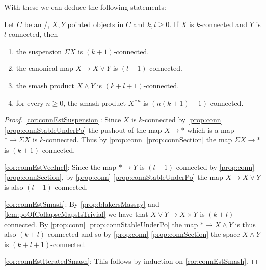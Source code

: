 With these we can deduce the following statements:
\begin{corollary}\label{cor:connEst}
    Let $C$ be an \inftytop/, $X,Y$ pointed objects in $C$ and $k,l\geq 0$. 
    If $X$ is $k$-connected and $Y$ is $l$-connected, then
    \begin{enumerate}[label={(\roman*)}]
        \item the suspension $\Sigma X$ is $(k+1)$-connected. \label{cor:connEstSuspension}
        \item the canonical map $X\to X\vee Y$ is $(l-1)$-connected. \label{cor:connEstVeeIncl}
        \item the smash product $X\wedge Y$ is $(k + l + 1)$-connected. \label{cor:connEstSmash}
        \item for every $n\geq 0$, the smash product $X^{\wedge n}$ is $(n(k+1)-1)$-connected. \label{cor:connEstIteratedSmash}
    \end{enumerate}
    \begin{proof}
        \ref{cor:connEstSuspension}: Since $X$ is $k$-connected by \cref{prop:conn} \ref{prop:connStableUnderPo} the pushout of the map $X\to *$ which is a map $*\to \Sigma X$ is $k$-connected.
        Thus by \cref{prop:conn} \ref{prop:connSection} the map $\Sigma X\to *$ is $(k+1)$-connected.

        \ref{cor:connEstVeeIncl}: Since the map $*\to Y$ is $(l-1)$-connected by \cref{prop:conn} \ref{prop:connSection}, by \cref{prop:conn} \ref{prop:connStableUnderPo} the map $X\to X\vee Y$ is also $(l-1)$-connected.
        
        \ref{cor:connEstSmash}: By \cref{prop:blakersMassay} and \cref{lem:poOfCollapseMapsIsTrivial} we have that $X\vee Y\to X\times Y$ is  $(k+l)$-connected. 
        By \cref{prop:conn} \ref{prop:connStableUnderPo} the map $*\to X\wedge Y$ is thus also $(k+l)$-connected and so by \cref{prop:conn} \ref{prop:connSection} the space $X\wedge Y$ is $(k+l+1)$-connected.

        \ref{cor:connEstIteratedSmash}: This follows by induction on \ref{cor:connEstSmash}.
    \end{proof}
\end{corollary}
